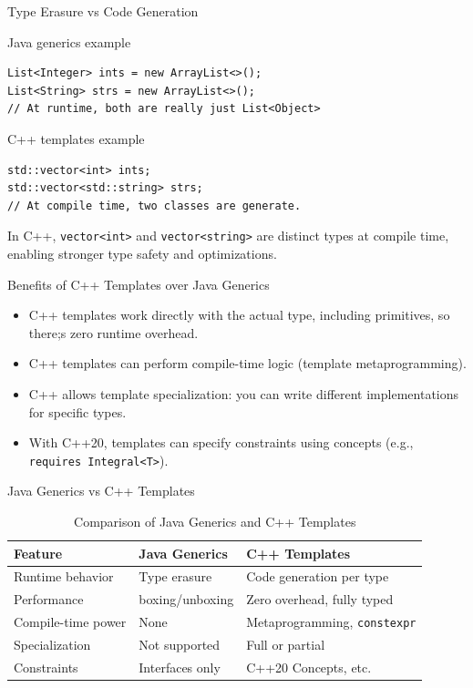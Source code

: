 \documentclass[14pt,aspectratio=1610, hyperref={pdfpagelayout=SinglePage}]{beamer}
\begin{document}
\begin{frame}[fragile]{Type Erasure vs Code Generation}

Java generics example
\begin{lstlisting}[basicstyle=\ttfamily\small]
List<Integer> ints = new ArrayList<>();
List<String> strs = new ArrayList<>();
// At runtime, both are really just List<Object>
\end{lstlisting}

C++ templates example
\begin{lstlisting}[basicstyle=\ttfamily\small]
std::vector<int> ints;
std::vector<std::string> strs;
// At compile time, two classes are generate.
\end{lstlisting}

In C++, \lstinline{vector<int>} and \lstinline{vector<string>} are distinct types at compile time, enabling stronger type safety and optimizations.
\end{frame}

\begin{frame}{Benefits of C++ Templates over Java Generics}
\begin{itemize}
\item C++ templates work directly with the actual type, including primitives, so there;s zero runtime overhead.
\item C++ templates can perform compile-time logic (template metaprogramming).
\item C++ allows template specialization: you can write different implementations for specific types.
\item With C++20, templates can specify constraints using concepts (e.g., \lstinline{requires Integral<T>}).
\end{itemize}
\end{frame}

\begin{frame}{Java Generics vs C++ Templates}
  \begin{table}[h!]
\centering\small
\begin{tabular}{lll}
\toprule
\textbf{Feature} & \textbf{Java Generics} & \textbf{C++ Templates} \\
\midrule
Runtime behavior & Type erasure  & Code generation per type \\
Performance      & boxing/unboxing & Zero overhead, fully typed \\
Compile-time power & None & Metaprogramming, \texttt{constexpr} \\
Specialization   & Not supported & Full or partial \\
Constraints      & Interfaces only & C++20 Concepts, etc. \\
\bottomrule
\end{tabular}
\caption{Comparison of Java Generics and C++ Templates}
\end{table}

\end{frame}
\end{document}
